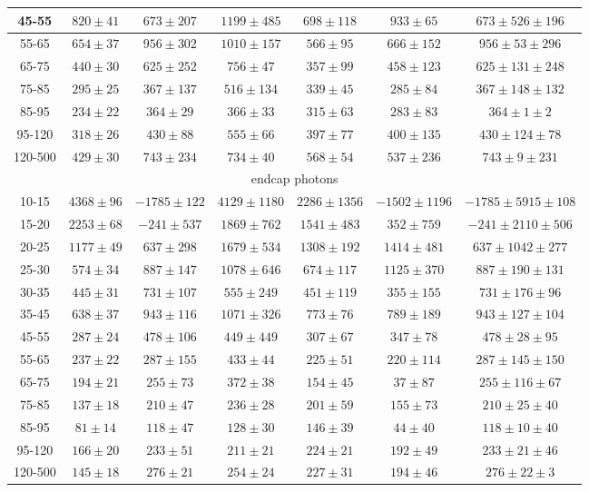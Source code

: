 \begin{table}[h]
\begin{center}
\begin{tabular}{|c|c|c|c|c|c|c|}
    45-55 & $820\pm41$ & $673\pm207$ & $1199\pm485$ & $698\pm118$ & $933\pm65$ &$673\pm526\pm196$  \\ \hline
    55-65 & $654\pm37$ & $956\pm302$ & $1010\pm157$ & $566\pm95$ & $666\pm152$ &$956\pm53\pm296$  \\ \hline
    65-75 & $440\pm30$ & $625\pm252$ & $756\pm47$ & $357\pm99$ & $458\pm123$ &$625\pm131\pm248$  \\ \hline
    75-85 & $295\pm25$ & $367\pm137$ & $516\pm134$ & $339\pm45$ & $285\pm84$ &$367\pm148\pm132$  \\ \hline
    85-95 & $234\pm22$ & $364\pm29$ & $366\pm33$ & $315\pm63$ & $283\pm83$ &$364\pm1\pm2$  \\ \hline
    95-120 & $318\pm26$ & $430\pm88$ & $555\pm66$ & $397\pm77$ & $400\pm135$ &$430\pm124\pm78$  \\ \hline
    120-500 & $429\pm30$ & $743\pm234$ & $734\pm40$ & $568\pm54$ & $537\pm236$ &$743\pm9\pm231$  \\ \hline
    \multicolumn{7}{|c|}{endcap photons} \\ \hline
     10-15 & $4368\pm96$ & $-1785\pm122$ & $4129\pm1180$ & $2286\pm1356$ & $-1502\pm1196$ &$-1785\pm5915\pm108$  \\ \hline
    15-20 & $2253\pm68$ & $-241\pm537$ & $1869\pm762$ & $1541\pm483$ & $352\pm759$ &$-241\pm2110\pm506$  \\ \hline
    20-25 & $1177\pm49$ & $637\pm298$ & $1679\pm534$ & $1308\pm192$ & $1414\pm481$ &$637\pm1042\pm277$  \\ \hline
    25-30 & $574\pm34$ & $887\pm147$ & $1078\pm646$ & $674\pm117$ & $1125\pm370$ &$887\pm190\pm131$  \\ \hline
    30-35 & $445\pm31$ & $731\pm107$ & $555\pm249$ & $451\pm119$ & $355\pm155$ &$731\pm176\pm96$  \\ \hline
    35-45 & $638\pm37$ & $943\pm116$ & $1071\pm326$ & $773\pm76$ & $789\pm189$ &$943\pm127\pm104$  \\ \hline
    45-55 & $287\pm24$ & $478\pm106$ & $449\pm449$ & $307\pm67$ & $347\pm78$ &$478\pm28\pm95$  \\ \hline
    55-65 & $237\pm22$ & $287\pm155$ & $433\pm44$ & $225\pm51$ & $220\pm114$ &$287\pm145\pm150$  \\ \hline
    65-75 & $194\pm21$ & $255\pm73$ & $372\pm38$ & $154\pm45$ & $37\pm87$ &$255\pm116\pm67$  \\ \hline
    75-85 & $137\pm18$ & $210\pm47$ & $236\pm28$ & $201\pm59$ & $155\pm73$ &$210\pm25\pm40$  \\ \hline
    85-95 & $81\pm14$ & $118\pm47$ & $128\pm30$ & $146\pm39$ & $44\pm40$ &$118\pm10\pm40$  \\ \hline
    95-120 & $166\pm20$ & $233\pm51$ & $211\pm21$ & $224\pm21$ & $192\pm49$ &$233\pm21\pm46$  \\ \hline
    120-500 & $145\pm18$ & $276\pm21$ & $254\pm24$ & $227\pm31$ & $194\pm46$ &$276\pm22\pm3$  \\ \hline
  \end{tabular}
  \label{tab:diff_ways_to_fit_phoEt_electron}
  \end{center}
\end{table}


